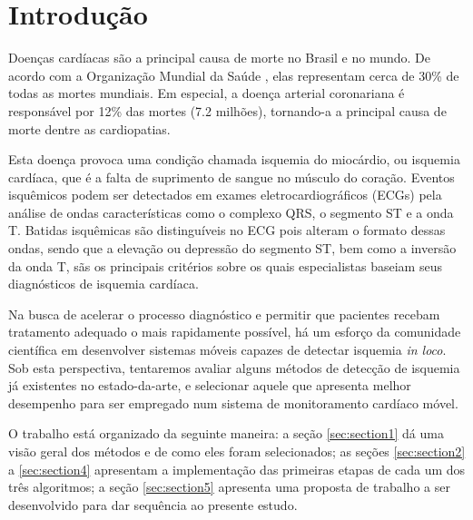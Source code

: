 
\section*{Introdução}
\label{sec:intro}

Doenças cardíacas são a principal causa de morte no Brasil e no mundo. De acordo com a Organização Mundial da Saúde \cite{Who04}, elas representam cerca de 30\% de todas as mortes mundiais. Em especial, a doença arterial coronariana é responsável por 12\% das mortes (7.2 milhões), tornando-a a principal causa de morte dentre as cardiopatias.

Esta doença provoca uma condição chamada isquemia do miocárdio, ou isquemia cardíaca, que é a falta de suprimento de sangue no músculo do coração. Eventos isquêmicos podem ser detectados em exames eletrocardiográficos (ECGs) pela análise de ondas características como o complexo QRS, o segmento ST e a onda T. Batidas isquêmicas são distinguíveis no ECG pois alteram o formato dessas ondas, sendo que a elevação ou depressão do segmento ST, bem como a inversão da onda T, sãs os principais critérios sobre os quais especialistas baseiam seus diagnósticos de isquemia cardíaca.

Na busca de acelerar o processo diagnóstico e permitir que pacientes recebam tratamento adequado o mais rapidamente possível, há um esforço da comunidade científica em desenvolver sistemas móveis capazes de detectar isquemia \emph{in loco}. Sob esta perspectiva, tentaremos avaliar alguns métodos de detecção de isquemia já existentes no estado-da-arte, e selecionar aquele que apresenta melhor desempenho para ser empregado num sistema de monitoramento cardíaco móvel.

O trabalho está organizado da seguinte maneira: a seção \ref{sec:section1} dá uma visão geral dos métodos e de como eles foram selecionados; as seções \ref{sec:section2} a \ref{sec:section4} apresentam a implementação das primeiras etapas de cada um dos três algoritmos; a seção \ref{sec:section5} apresenta uma proposta de trabalho a ser desenvolvido para dar sequência ao presente estudo.
